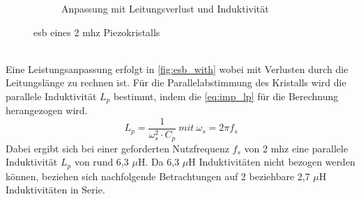 \begin{figure}[h!]
\begin{subfigure}[b]{0.56\textwidth}
  		\caption{Anpassung mit Leitungsverlust und Induktivität}
  		\label{fig:esb_with}
  	\end{subfigure}
  	\caption{\acs{esb} eines 2 \acs{mhz} Piezokristalls}
  	\label{fig:piezo}
\end{figure}\\
Eine Leistungsanpassung erfolgt in \autoref{fig:esb_with} wobei mit Verlusten durch die Leitungslänge zu rechnen ist. Für die Parallelabstimmung des Kristalls wird die parallele Induktivität $L_{p}$ bestimmt, indem die \autoref{eq:imp_lp} für die Berechnung herangezogen wird.
\begin{equation}
L_{p}=\dfrac{1}{\omega_s^2\cdot C_p}\ mit\ \omega_s=2\pi f_s\label{eq:imp_lp}
\end{equation}
Dabei ergibt sich bei einer geforderten Nutzfrequenz $f_s$ von 2 \ac{mhz} eine parallele Induktivität $L_p$ von rund 6,3 $\mu$H. Da 6,3 $\mu$H Induktivitäten nicht bezogen werden können, beziehen sich nachfolgende Betrachtungen auf 2 beziehbare 2,7 $\mu$H Induktivitäten in Serie.
